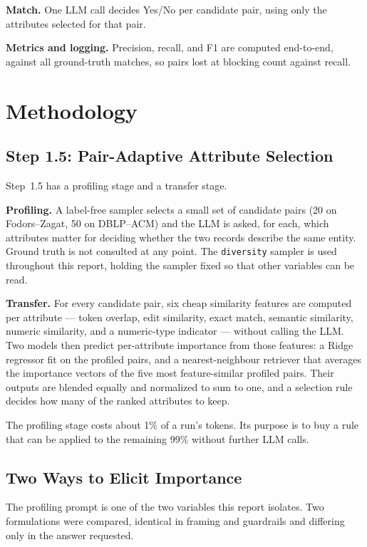 \documentclass[11pt]{article}
\begin{document}
\textbf{Match.} One LLM call decides Yes/No per candidate pair, using only the attributes
selected for that pair.

\textbf{Metrics and logging.} Precision, recall, and F1 are computed end-to-end, against all
ground-truth matches, so pairs lost at blocking count against recall.

\section{Methodology}
\label{sec:methodology}

\subsection{Step 1.5: Pair-Adaptive Attribute Selection}

Step~1.5 has a profiling stage and a transfer stage.

\textbf{Profiling.} A label-free sampler selects a small set of candidate pairs (20 on
Fodors--Zagat, 50 on DBLP--ACM) and the LLM is asked, for each, which attributes matter for
deciding whether the two records describe the same entity. Ground truth is not consulted at
any point. The \texttt{diversity} sampler is used throughout this report, holding the
sampler fixed so that other variables can be read.

\textbf{Transfer.} For every candidate pair, six cheap similarity features are computed per
attribute --- token overlap, edit similarity, exact match, semantic similarity, numeric
similarity, and a numeric-type indicator --- without calling the LLM. Two models then
predict per-attribute importance from those features: a Ridge regressor fit on the profiled
pairs, and a nearest-neighbour retriever that averages the importance vectors of the five
most feature-similar profiled pairs. Their outputs are blended equally and normalized to sum
to one, and a selection rule decides how many of the ranked attributes to keep.

The profiling stage costs about 1\% of a run's tokens. Its purpose is to buy a rule that can
be applied to the remaining 99\% without further LLM calls.

\subsection{Two Ways to Elicit Importance}
\label{sec:scoring}

The profiling prompt is one of the two variables this report isolates. Two formulations were
compared, identical in framing and guardrails and differing only in the answer requested.
\end{document}
